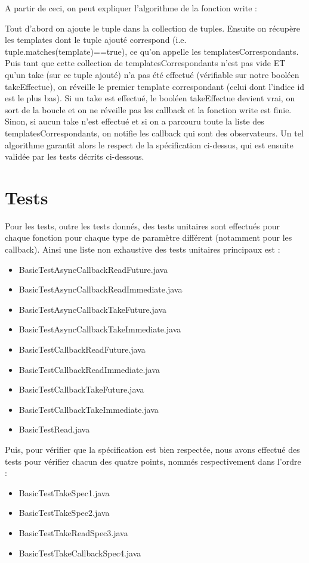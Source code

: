 \documentclass{report}
\begin{document}
A partir de ceci, on peut expliquer l'algorithme de la fonction write :

Tout d'abord on ajoute le tuple dans la collection de tuples. Ensuite on récupère les templates dont le tuple ajouté correspond (i.e. tuple.matches(template)==true), ce qu'on appelle
les templatesCorrespondants. Puis tant que cette collection de templatesCorrespondants n'est pas vide ET qu'un take (sur ce tuple ajouté) n'a pas
été effectué (vérifiable sur notre booléen takeEffectue), on réveille le premier template correspondant (celui dont l'indice id est le plus bas).
Si un take est effectué, le booléen takeEffectue devient vrai, on sort de la boucle et on ne réveille pas les callback et la fonction write est finie.
Sinon, si aucun take n'est effectué et si on a parcouru toute la liste des templatesCorrespondants, on notifie les callback qui sont des observateurs.
Un tel algorithme garantit alors le respect de la spécification ci-dessus, qui est ensuite validée par les tests décrits ci-dessous.

\section{Tests}

Pour les tests, outre les tests donnés, des tests unitaires sont effectués pour chaque fonction pour chaque type de paramètre différent (notamment pour les callback). Ainsi une liste non exhaustive des tests unitaires principaux est :
\begin{itemize}
\item BasicTestAsyncCallbackReadFuture.java
\item BasicTestAsyncCallbackReadImmediate.java
\item BasicTestAsyncCallbackTakeFuture.java
\item BasicTestAsyncCallbackTakeImmediate.java
\item BasicTestCallbackReadFuture.java
\item BasicTestCallbackReadImmediate.java
\item BasicTestCallbackTakeFuture.java
\item BasicTestCallbackTakeImmediate.java
\item BasicTestRead.java
\end{itemize}

Puis, pour vérifier que la spécification est bien respectée, nous avons effectué des tests pour vérifier chacun des quatre points, nommés respectivement dans l'ordre :
\begin{itemize}
\item BasicTestTakeSpec1.java
\item BasicTestTakeSpec2.java
\item BasicTestTakeReadSpec3.java
\item BasicTestTakeCallbackSpec4.java
\end{itemize}
\end{document}
